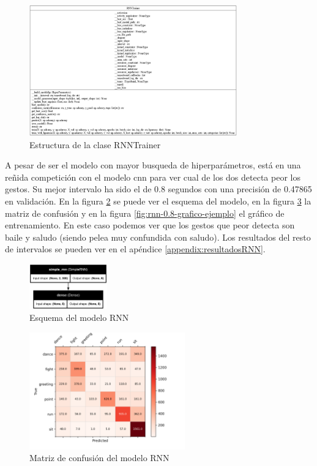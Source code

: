 \begin{figure}[h!]
    \centering
    \includegraphics[width=0.8\textwidth]{Imagenes/Bitmap/classes_RNNTrainer.png}
    \caption{Estructura de la clase RNNTrainer}
    \label{fig:rnn-estructura}
\end{figure}

A pesar de ser el modelo con mayor busqueda de hiperparámetros, está en una reñida competición con el modelo \gls{cnn} para ver cual de los dos detecta peor los gestos. Su mejor intervalo ha sido el de 0.8 segundos con una precisión de 0.47865 en validación. En la figura \ref{fig:rnn-0.8-ejemplo} se puede ver el esquema del modelo, en la figura \ref{fig:rnn-0.8-matriz-ejemplo} la matriz de confusión y en la figura \ref{fig:rnn-0.8-grafico-ejemplo} el gráfico de entrenamiento. En este caso podemos ver que los gestos que peor detecta son baile y saludo (siendo pelea muy confundida con saludo). Los resultados del resto de intervalos se pueden ver en el apéndice \ref{appendix:resultadosRNN}.

\begin{figure}[H]
    \centering
    \includegraphics[width=0.3\textwidth]{Imagenes/Bitmap/best-rnn0.8.png}
    \caption{Esquema del modelo RNN}
    \label{fig:rnn-0.8-ejemplo}
\end{figure}

\begin{figure}[H]
    \centering
    \includegraphics[width=0.6\textwidth]{Imagenes/Bitmap/CM_best-rnn0.8.png}
    \caption{Matriz de confusión del modelo RNN}
    \label{fig:rnn-0.8-matriz-ejemplo}
\end{figure}

